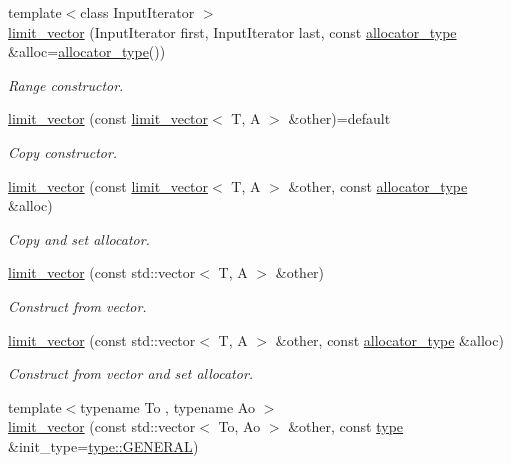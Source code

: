 \begin{DoxyCompactItemize}
{\footnotesize template$<$class Input\+Iterator $>$ }\\\hyperlink{classIceBRG_1_1limit__vector_a28cc72fd30edd1fd9b6a0fba2793e18d}{limit\+\_\+vector} (Input\+Iterator first, Input\+Iterator last, const \hyperlink{classIceBRG_1_1limit__vector_ac75a579f04baed676ee916b0ad3dfec0}{allocator\+\_\+type} \&alloc=\hyperlink{classIceBRG_1_1limit__vector_ac75a579f04baed676ee916b0ad3dfec0}{allocator\+\_\+type}())
\begin{DoxyCompactList}\small\item\em Range constructor. \end{DoxyCompactList}\item 
\hyperlink{classIceBRG_1_1limit__vector_ae25a8bfadeba89edbd4b3c62bfcf2455}{limit\+\_\+vector} (const \hyperlink{classIceBRG_1_1limit__vector}{limit\+\_\+vector}$<$ T, A $>$ \&other)=default
\begin{DoxyCompactList}\small\item\em Copy constructor. \end{DoxyCompactList}\item 
\hyperlink{classIceBRG_1_1limit__vector_a6cc469394ec08a62f8a2a09e15d81ae2}{limit\+\_\+vector} (const \hyperlink{classIceBRG_1_1limit__vector}{limit\+\_\+vector}$<$ T, A $>$ \&other, const \hyperlink{classIceBRG_1_1limit__vector_ac75a579f04baed676ee916b0ad3dfec0}{allocator\+\_\+type} \&alloc)
\begin{DoxyCompactList}\small\item\em Copy and set allocator. \end{DoxyCompactList}\item 
\hyperlink{classIceBRG_1_1limit__vector_a155c43501fd2a683cbc7aa04ae484cbe}{limit\+\_\+vector} (const std\+::vector$<$ T, A $>$ \&other)
\begin{DoxyCompactList}\small\item\em Construct from vector. \end{DoxyCompactList}\item 
\hyperlink{classIceBRG_1_1limit__vector_ad051401ed395c6fe5e556d51e16416ef}{limit\+\_\+vector} (const std\+::vector$<$ T, A $>$ \&other, const \hyperlink{classIceBRG_1_1limit__vector_ac75a579f04baed676ee916b0ad3dfec0}{allocator\+\_\+type} \&alloc)
\begin{DoxyCompactList}\small\item\em Construct from vector and set allocator. \end{DoxyCompactList}\item 
{\footnotesize template$<$typename To , typename Ao $>$ }\\\hyperlink{classIceBRG_1_1limit__vector_ad49259faea655cb776389d009c5d30a1}{limit\+\_\+vector} (const std\+::vector$<$ To, Ao $>$ \&other, const \hyperlink{classIceBRG_1_1limit__vector_a67ad5ccda3b716a3aca2fa6223e75681}{type} \&init\+\_\+type=\hyperlink{classIceBRG_1_1limit__vector_a67ad5ccda3b716a3aca2fa6223e75681ab61773b9b3968a9988d765d728985862}{type\+::\+G\+E\+N\+E\+R\+A\+L})

\end{DoxyCompactItemize}
